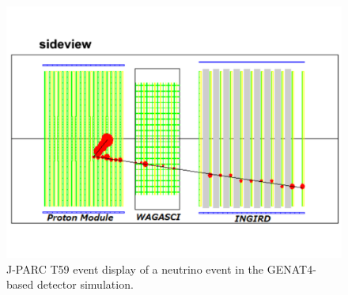 \begin{figure}[tbh]
\begin{center}
\includegraphics[width=0.8\linewidth]{fig/t59_event_display_oct_dec_2017.pdf}
\end{center}
\caption{
J-PARC T59 event display of a neutrino event in the GENAT4-based detector simulation.
}
\label{fig:t59_event_display_oct_dec_2017}
\end{figure}



